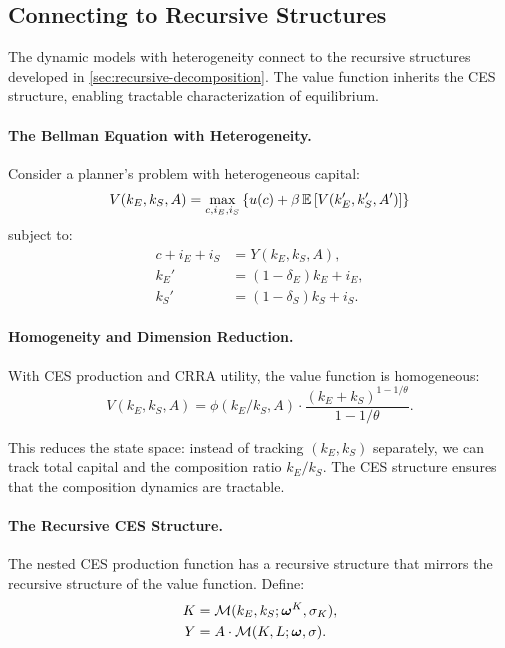 \subsection{Connecting to Recursive Structures}
\label{subsec:recursive-connection}

The dynamic models with heterogeneity connect to the recursive structures developed in \cref{sec:recursive-decomposition}. The value function inherits the CES structure, enabling tractable characterization of equilibrium.

\paragraph{The Bellman Equation with Heterogeneity.}
Consider a planner's problem with heterogeneous capital:
\begin{equation}
V(k_E, k_S, A) = \max_{c, i_E, i_S} \left\{ u(c) + \beta \, \mathbb{E} \left[ V(k_E', k_S', A') \right] \right\}
\label{eq:bellman-hetero}
\end{equation}
subject to:
\begin{align}
c + i_E + i_S &= Y(k_E, k_S, A), \\
k_E' &= (1-\delta_E) k_E + i_E, \\
k_S' &= (1-\delta_S) k_S + i_S.
\end{align}

\paragraph{Homogeneity and Dimension Reduction.}
With CES production and CRRA utility, the value function is homogeneous:
\begin{equation}
V(k_E, k_S, A) = \phi(k_E/k_S, A) \cdot \frac{(k_E + k_S)^{1-1/\theta}}{1 - 1/\theta}.
\label{eq:value-homogeneous}
\end{equation}

This reduces the state space: instead of tracking $(k_E, k_S)$ separately, we can track total capital and the composition ratio $k_E/k_S$. The CES structure ensures that the composition dynamics are tractable.

\paragraph{The Recursive CES Structure.}
The nested CES production function has a recursive structure that mirrors the recursive structure of the value function. Define:
\begin{align}
K &= \mathcal{M}(k_E, k_S; \boldsymbol{\omega}^K, \sigma_K), \\
Y &= A \cdot \mathcal{M}(K, L; \boldsymbol{\omega}, \sigma).
\end{align}

